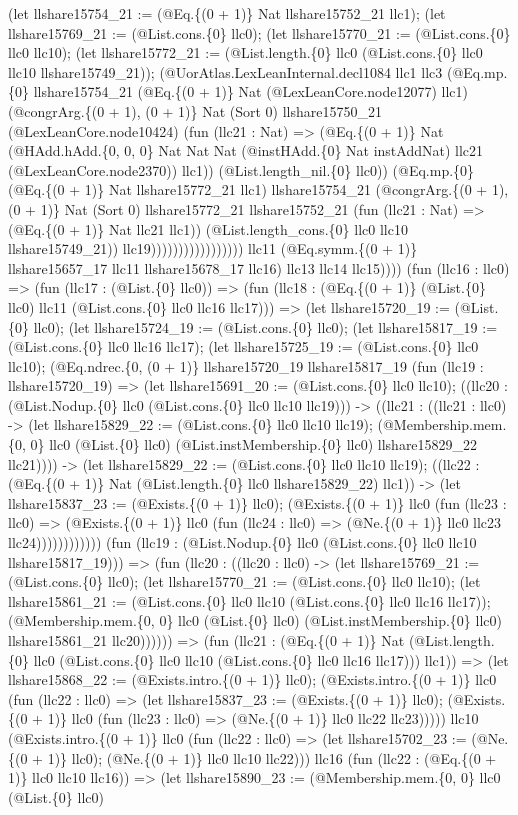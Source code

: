 \documentclass[11pt]{article}
\begin{document}
(let llshare15754\_21 := (@Eq.\{(0 + 1)\} Nat llshare15752\_21 llc1); (let llshare15769\_21 := (@List.cons.\{0\} llc0); (let llshare15770\_21 := (@List.cons.\{0\} llc0 llc10); (let llshare15772\_21 := (@List.length.\{0\} llc0 (@List.cons.\{0\} llc0 llc10 llshare15749\_21)); (@UorAtlas.LexLeanInternal.decl1084 llc1 llc3 (@Eq.mp.\{0\} llshare15754\_21 (@Eq.\{(0 + 1)\} Nat (@LexLeanCore.node12077) llc1) (@congrArg.\{(0 + 1), (0 + 1)\} Nat (Sort 0) llshare15750\_21 (@LexLeanCore.node10424) (fun (llc21 : Nat) => (@Eq.\{(0 + 1)\} Nat (@HAdd.hAdd.\{0, 0, 0\} Nat Nat Nat (@instHAdd.\{0\} Nat instAddNat) llc21 (@LexLeanCore.node2370)) llc1)) (@List.length\_nil.\{0\} llc0)) (@Eq.mp.\{0\} (@Eq.\{(0 + 1)\} Nat llshare15772\_21 llc1) llshare15754\_21 (@congrArg.\{(0 + 1), (0 + 1)\} Nat (Sort 0) llshare15772\_21 llshare15752\_21 (fun (llc21 : Nat) => (@Eq.\{(0 + 1)\} Nat llc21 llc1)) (@List.length\_cons.\{0\} llc0 llc10 llshare15749\_21)) llc19))))))))))))))))) llc11 (@Eq.symm.\{(0 + 1)\} llshare15657\_17 llc11 llshare15678\_17 llc16) llc13 llc14 llc15)))) (fun (llc16 : llc0) => (fun (llc17 : (@List.\{0\} llc0)) => (fun (llc18 : (@Eq.\{(0 + 1)\} (@List.\{0\} llc0) llc11 (@List.cons.\{0\} llc0 llc16 llc17))) => (let llshare15720\_19 := (@List.\{0\} llc0); (let llshare15724\_19 := (@List.cons.\{0\} llc0); (let llshare15817\_19 := (@List.cons.\{0\} llc0 llc16 llc17); (let llshare15725\_19 := (@List.cons.\{0\} llc0 llc10); (@Eq.ndrec.\{0, (0 + 1)\} llshare15720\_19 llshare15817\_19 (fun (llc19 : llshare15720\_19) => (let llshare15691\_20 := (@List.cons.\{0\} llc0 llc10); ((llc20 : (@List.Nodup.\{0\} llc0 (@List.cons.\{0\} llc0 llc10 llc19))) -> ((llc21 : ((llc21 : llc0) -> (let llshare15829\_22 := (@List.cons.\{0\} llc0 llc10 llc19); (@Membership.mem.\{0, 0\} llc0 (@List.\{0\} llc0) (@List.instMembership.\{0\} llc0) llshare15829\_22 llc21)))) -> (let llshare15829\_22 := (@List.cons.\{0\} llc0 llc10 llc19); ((llc22 : (@Eq.\{(0 + 1)\} Nat (@List.length.\{0\} llc0 llshare15829\_22) llc1)) -> (let llshare15837\_23 := (@Exists.\{(0 + 1)\} llc0); (@Exists.\{(0 + 1)\} llc0 (fun (llc23 : llc0) => (@Exists.\{(0 + 1)\} llc0 (fun (llc24 : llc0) => (@Ne.\{(0 + 1)\} llc0 llc23 llc24)))))))))))) (fun (llc19 : (@List.Nodup.\{0\} llc0 (@List.cons.\{0\} llc0 llc10 llshare15817\_19))) => (fun (llc20 : ((llc20 : llc0) -> (let llshare15769\_21 := (@List.cons.\{0\} llc0); (let llshare15770\_21 := (@List.cons.\{0\} llc0 llc10); (let llshare15861\_21 := (@List.cons.\{0\} llc0 llc10 (@List.cons.\{0\} llc0 llc16 llc17)); (@Membership.mem.\{0, 0\} llc0 (@List.\{0\} llc0) (@List.instMembership.\{0\} llc0) llshare15861\_21 llc20)))))) => (fun (llc21 : (@Eq.\{(0 + 1)\} Nat (@List.length.\{0\} llc0 (@List.cons.\{0\} llc0 llc10 (@List.cons.\{0\} llc0 llc16 llc17))) llc1)) => (let llshare15868\_22 := (@Exists.intro.\{(0 + 1)\} llc0); (@Exists.intro.\{(0 + 1)\} llc0 (fun (llc22 : llc0) => (let llshare15837\_23 := (@Exists.\{(0 + 1)\} llc0); (@Exists.\{(0 + 1)\} llc0 (fun (llc23 : llc0) => (@Ne.\{(0 + 1)\} llc0 llc22 llc23))))) llc10 (@Exists.intro.\{(0 + 1)\} llc0 (fun (llc22 : llc0) => (let llshare15702\_23 := (@Ne.\{(0 + 1)\} llc0); (@Ne.\{(0 + 1)\} llc0 llc10 llc22))) llc16 (fun (llc22 : (@Eq.\{(0 + 1)\} llc0 llc10 llc16)) => (let llshare15890\_23 := (@Membership.mem.\{0, 0\} llc0 (@List.\{0\} llc0) 
\end{document}
